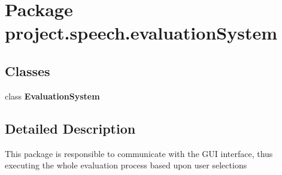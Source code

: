 \section{Package project.\+speech.\+evaluation\+System}
\label{namespaceproject_1_1speech_1_1evaluation_system}
\subsection*{Classes}
\begin{DoxyCompactItemize}
\item 
class {\bf Evaluation\+System}
\end{DoxyCompactItemize}


\subsection{Detailed Description}
This package is responsible to communicate with the G\+U\+I interface, thus executing the whole evaluation process based upon user selections 